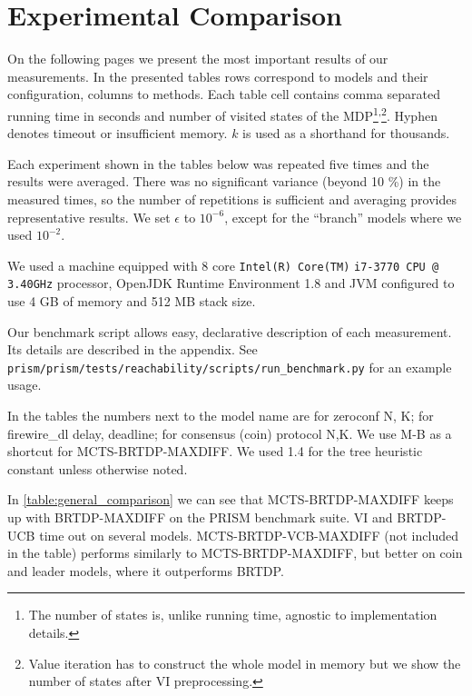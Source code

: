 \section{Experimental Comparison}

On the following pages we present the most important results of our measurements.
In the presented tables rows correspond to models and their
configuration, columns to methods.
Each table cell contains comma separated running time in
seconds and number of visited states of the MDP\footnote{The number of
states is, unlike running time, agnostic to implementation details.}\textsuperscript{,}\footnote{Value iteration has to construct the
whole model in memory but we show the number of states after VI
preprocessing.}. Hyphen denotes timeout or insufficient memory.
$k$ is used as a shorthand for thousands.

Each experiment shown in the tables below was repeated five
times and the results were averaged. There was no significant
variance (beyond 10 \%) in the measured times, so the number of repetitions is
sufficient and averaging provides representative results. We set
$\epsilon$ to $10^{-6}$, except for the ``branch'' models where we used
$10^{-2}$.

We used a machine equipped with
8 core \verb|Intel(R) Core(TM)| \verb|i7-3770 CPU @ 3.40GHz| processor,
OpenJDK Runtime Environment 1.8 and JVM configured to use 4 GB of memory
and 512 MB stack size.

Our benchmark script allows easy, declarative description of each measurement.
Its details are described in the appendix.
See \linebreak
\verb|prism/prism/tests/reachability/scripts/run_benchmark.py| for \linebreak
an example usage.

In the tables the numbers next to the model name are for zeroconf N, K; for
firewire\_dl delay, deadline; for consensus (coin) protocol N,K. We use M-B as a
shortcut for MCTS-BRTDP-MAXDIFF.  We used 1.4 for the tree heuristic constant
unless otherwise noted.

In \autoref{table:general_comparison} we can see that MCTS-BRTDP-MAXDIFF
keeps up with BRTDP-MAXDIFF on the PRISM benchmark suite.
VI and BRTDP-UCB time out on several models. MCTS-BRTDP-VCB-MAXDIFF (not
included in the table) performs similarly to MCTS-BRTDP-MAXDIFF, but better
on coin and leader models, where it outperforms BRTDP.

